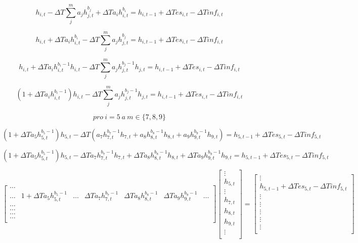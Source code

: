 {$$
  h_{i,t} - \Delta T \sum_j^m a_jh^{b_{j}}_{j,t} + \Delta T a_ih^{b_{i}}_{i,t} = h_{i,t-1} + \Delta T es_{i,t} - \Delta T inf_{i,t}
$$



$$
  h_{i,t} + \Delta T a_ih^{b_{i}}_{i,t} - \Delta T \sum_j^m a_jh^{b_{j}}_{j,t}  = h_{i,t-1} + \Delta T es_{i,t} - \Delta T inf_{i,t}
$$

$$
  h_{i,t} + \Delta T a_ih^{b_{i}-1}_{i,t} h_{i,t} - \Delta T \sum_j^m a_jh^{b_{j}-1}_{j,t} h_{j,t} = h_{i,t-1} + \Delta T es_{i,t} - \Delta T inf_{i,t}
$$


$$
  (1+\Delta T a_ih^{b_{i}-1}_{i,t})h_{i,t} - \Delta T \sum_j^m a_jh^{b_{j}-1}_{j,t} h_{j,t} = h_{i,t-1} + \Delta T es_{i,t} - \Delta T inf_{i,t}
$$

$$
pro\ i=5\ a\ m\in\{7,8,9\}
$$



$$
  (1+\Delta T a_5h^{b_{5}-1}_{5,t})h_{5,t} - \Delta T ( a_7h^{b_{7}-1}_{7,t} h_{7,t} + a_8h^{b_{8}-1}_{8,t} h_{8,t} + a_9 h^{b_{9}-1}_{9,t} h_{9,t} ) = h_{5,t-1} + \Delta T es_{5,t} - \Delta T inf_{5,t}
$$



$$
  (1+\Delta T a_5h^{b_{5}-1}_{5,t})h_{5,t} - \Delta T a_7h^{b_{7}-1}_{7,t} h_{7,t} + \Delta T a_8h^{b_{8}-1}_{8,t} h_{8,t} + \Delta T a_9 h^{b_{9}-1}_{9,t} h_{9,t}  = h_{5,t-1} + \Delta T es_{5,t} - \Delta T inf_{5,t}
$$



\begin{equation}
\begin{bmatrix}
\hdots& & & & & &  \\
\hdots  & 1+\Delta T a_5h^{b_{5}-1}_{5,t} & \hdots &  \Delta T a_7h^{b_{7}-1}_{7,t} &  \Delta T a_8h^{b_{8}-1}_{8,t} & \Delta T a_9 h^{b_{9}-1}_{9,t} & \hdots \\
\hdots&  & & & & &  \\
\hdots& && &  &  & \\
\hdots& && &  &   & \\
\hdots& && &  &   & \\

\end{bmatrix} 
% 
\begin{bmatrix}
 \vdots \\
 h_{5,t} \\
 \vdots \\
 h_{7,t} \\
 h_{8,t} \\
 h_{9,t} \\
 \vdots \\
%  
\end{bmatrix}
=
\begin{bmatrix}
 \vdots \\
h_{5,t-1} + \Delta T es_{5,t} - \Delta T inf_{5,t} \\
 \vdots \\
 \vdots \\
 \vdots \\
 \vdots \\
 \vdots \\
%  
\end{bmatrix}
\end{equation}


}
